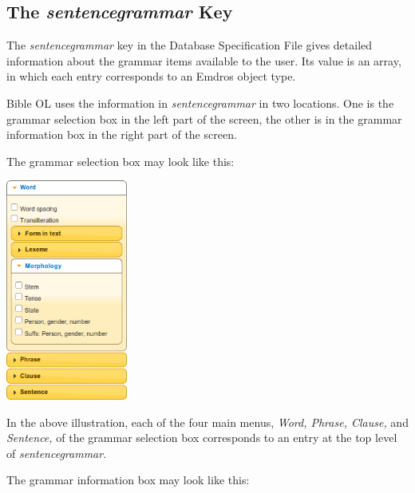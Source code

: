 \documentclass[11pt,oneside,a4paper]{memoir}
\begin{document}
\subsection{The \emph{sentencegrammar} Key}\label{sentencegrammar}

The \emph{sentencegrammar} key in the Database Specification File gives detailed information about
the grammar items available to the user. Its value is an array, in which each entry
corresponds to an Emdros object type.

Bible OL uses the information in \emph{sentencegrammar} in two locations. One is the grammar
selection box in the left part of the screen, the other is in the
grammar information box in the right part of the screen.

The grammar selection box may look like this:

\begin{center}
  \includegraphics[width=0.3\textwidth]{grammarselect.png}\label{grammarselect}
\end{center}

In the above illustration, each of the four main menus, \emph{Word, Phrase, Clause,} and
\emph{Sentence,} of the grammar selection box corresponds to an entry at the top level of
\emph{sentencegrammar}.

The grammar information box may look like this:
\end{document}
